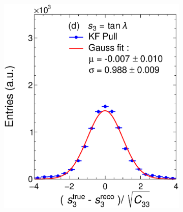 \begin{figure}[t]
\begin{subfigure}{0.32\textwidth}
         \caption{}
         \label{fig:resp2KF_GArLite_ALICE+KF}
     \end{subfigure}
          \begin{subfigure}{0.32\textwidth}
         \centering
         \includegraphics[width=\textwidth]{figures/ch4-KF_NDGArLite/MC/ALICE+KF/UnitKFEnd_p3.eps}
         \caption{}
         \label{fig:resp3KF_GArLite_ALICE+KF}
     \end{subfigure}
     \begin{subfigure}{0.32\textwidth}
         \centering

\end{subfigure}
\end{figure}
